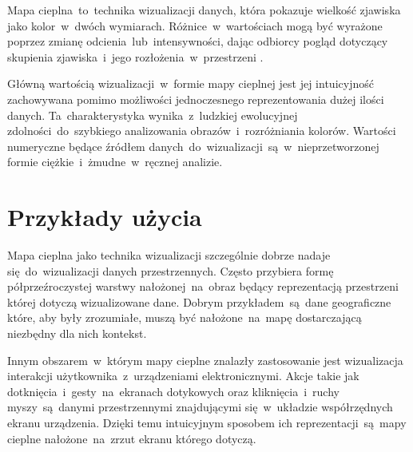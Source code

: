 Mapa cieplna~to~technika wizualizacji danych, która pokazuje wielkość zjawiska jako kolor~w~dwóch wymiarach. Różnice~w~wartościach mogą być wyrażone poprzez zmianę odcienia~lub~intensywności, dając odbiorcy pogląd dotyczący skupienia zjawiska~i~jego rozłożenia~w~przestrzeni \cite{Heat_map_definition}.

Główną wartością wizualizacji~w~formie mapy cieplnej jest jej intuicyjność zachowywana pomimo możliwości jednoczesnego reprezentowania dużej ilości danych. Ta~charakterystyka wynika~z~ludzkiej ewolucyjnej zdolności~do~szybkiego analizowania obrazów~i~rozróżniania kolorów. Wartości numeryczne będące źródłem danych~do~wizualizacji~są~w~nieprzetworzonej formie ciężkie~i~żmudne~w~ręcznej analizie.

\section{Przykłady użycia}
Mapa cieplna jako technika wizualizacji szczególnie dobrze nadaje się~do~wizualizacji danych przestrzennych. Często przybiera formę półprzeźroczystej warstwy nałożonej~na~obraz będący reprezentacją przestrzeni której dotyczą wizualizowane dane. Dobrym przykładem~są~dane geograficzne które, aby były zrozumiałe, muszą być nałożone~na~mapę dostarczającą niezbędny dla nich kontekst.


Innym obszarem~w~którym mapy cieplne znalazły zastosowanie jest wizualizacja interakcji użytkownika~z~urządzeniami elektronicznymi. Akcje takie jak dotknięcia~i~gesty~na~ekranach dotykowych oraz kliknięcia~i~ruchy myszy~są~danymi przestrzennymi znajdującymi się~w~układzie współrzędnych ekranu urządzenia. Dzięki temu intuicyjnym  sposobem ich reprezentacji~są~mapy cieplne nałożone~na~zrzut ekranu którego dotyczą.

